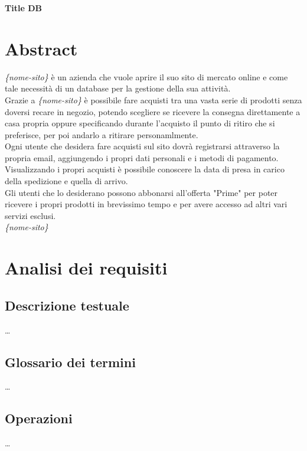 \documentclass[11pt]{article}
\begin{document}
\begin{center}
    \huge\textbf{Title DB}
\end{center}

\section{Abstract}

\textit{\{nome-sito\}} è un azienda che vuole aprire il suo sito di mercato online e 
come tale necessità di un database per la gestione della sua attività.\\
Grazie a \textit{\{nome-sito\}} è possibile fare acquisti tra una vasta serie di prodotti 
senza doversi recare in negozio, potendo scegliere se ricevere la consegna direttamente a casa
propria oppure specificando durante l'acquisto il punto di ritiro che si preferisce,
per poi andarlo a ritirare personamlmente.\\
Ogni utente che desidera fare acquisti sul sito dovrà registrarsi attraverso la propria email,
aggiungendo i propri dati personali e i metodi di pagamento.\\
Visualizzando i propri acquisti è possibile conoscere la data di presa in carico della spedizione
e quella di arrivo.\\
Gli utenti che lo desiderano possono abbonarsi all'offerta "Prime" per poter ricevere i propri
prodotti in brevissimo tempo e per avere accesso ad altri vari servizi esclusi.\\
\textit{\{nome-sito\}}

\section{Analisi dei requisiti}

\subsection{Descrizione testuale}

\dots

\subsection{Glossario dei termini}

\dots

\subsection{Operazioni}

\dots
\end{document}
